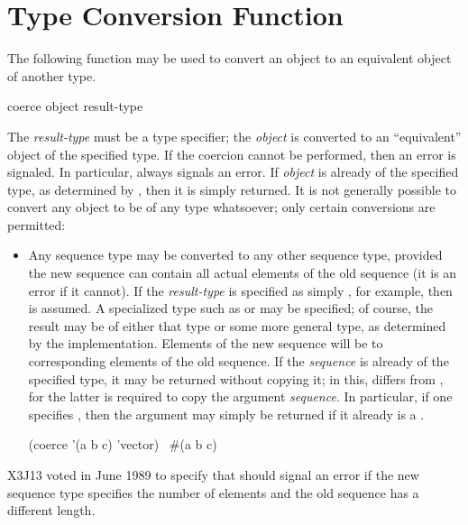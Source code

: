 \section{Type Conversion Function}

The following function may be used to convert an object to an
equivalent object of another type.

\begin{defun}[Function]
coerce object result-type

The {\it result-type} must be a type specifier; the {\it object} is converted
to an ``equivalent'' object of the specified type.
If the coercion cannot be performed, then an error is signaled.
In particular,  always signals an error.
If {\it object} is already of the specified type, as determined
by , then it is simply returned.
It is not generally
possible to convert any object to be of any type whatsoever; only certain
conversions are permitted:
\begin{itemize}
\item
Any sequence type may be converted to any other sequence type, provided
the new sequence can contain all actual elements of the old sequence
(it is an error if it cannot).  If the {\it result-type} is specified as
simply , for example, then  is assumed.  A
specialized type such as  or 
may be specified; of course, the result may be of either that type or
some more general type, as determined by the implementation.
Elements of the new sequence will be  to corresponding elements
of the old sequence.
If the
{\it sequence} is already of the specified type, it may be returned without
copying it; in this,  differs from
, for the latter is required to
copy the argument {\it sequence}.  In particular, if one specifies
, then the argument may simply be returned if it already is
a .
\begin{lisp}
(coerce '(a b c) 'vector) \EV\ \#(a b c)
\end{lisp}
\end{itemize}

\begin{newer}
X3J13 voted in June 1989  to specify that
 should signal an error if the new sequence type specifies the
number of elements and the old sequence has a different length.
\end{newer}


\end{defun}
